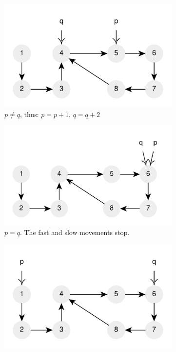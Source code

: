 \begin{figure}
\begin{subfigure}[l]{0.36\textwidth}
		\label{fig:cycle_in_list:floyd4}
	 \end{subfigure}
	 \hfill
	 \begin{subfigure}[l]{0.36\textwidth}
		\includegraphics[width=1\linewidth]{sources/cycle_in_list/images/floyd5}
		\caption{$p \neq q$,  thus: $p=p+1$, $q=q+2$}
		\label{fig:cycle_in_list:floyd5}
	 \end{subfigure}
	 \hfill
	 \begin{subfigure}[l]{0.36\textwidth}
		\includegraphics[width=1\linewidth]{sources/cycle_in_list/images/floyd6}
		\caption{$p = q$. The fast and slow movements stop.}
		\label{fig:cycle_in_list:floyd6}
	 \end{subfigure}
	 \hfill
	 \begin{subfigure}[l]{0.36\textwidth}
		\includegraphics[width=1\linewidth]{sources/cycle_in_list/images/floyd7}

\end{subfigure}
\end{figure}
